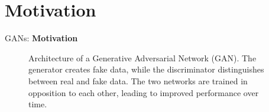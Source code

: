 \section{Motivation}
\begin{frame}{}
    \LARGE GANs: \textbf{Motivation}
\end{frame}

\begin{frame}[allowframebreaks]{}
    \begin{figure}
        \centering
        \caption*{Architecture of a Generative Adversarial Network (GAN). The generator creates fake data, while the discriminator distinguishes between real and fake data. The two networks are trained in opposition to each other, leading to improved performance over time.}
    \end{figure}
\end{frame}

